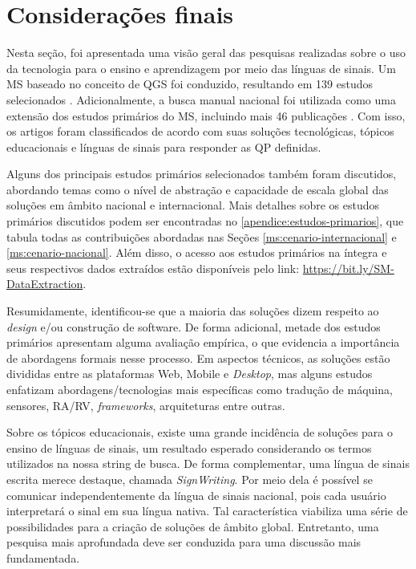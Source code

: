 \section{Considerações finais}
\label{ms:fim}

Nesta seção, foi apresentada uma visão geral das pesquisas realizadas sobre o uso da tecnologia para o ensino e aprendizagem por meio das línguas de sinais. Um MS baseado no conceito de QGS foi conduzido, resultando em 139 estudos selecionados \cite{FalvoJr2020_FIE}. Adicionalmente, a busca manual nacional foi utilizada como uma extensão dos estudos primários do MS, incluindo mais 46 publicações \cite{FalvoJr2020_SBIE}. Com isso, os artigos foram classificados de acordo com suas soluções tecnológicas, tópicos educacionais e línguas de sinais para responder as QP definidas. 

Alguns dos principais estudos primários selecionados também foram discutidos, abordando temas como o nível de abstração e capacidade de escala global das soluções em âmbito nacional e internacional. Mais detalhes sobre os estudos primários discutidos podem ser encontradas no \autoref{apendice:estudos-primarios}, que tabula todas as contribuições abordadas nas Seções \ref{ms:cenario-internacional} e \ref{ms:cenario-nacional}. Além disso, o acesso aos estudos primários na íntegra e seus respectivos dados extraídos estão disponíveis pelo link: \url{https://bit.ly/SM-DataExtraction}.

Resumidamente, identificou-se que a maioria das soluções dizem respeito ao \textit{design} e/ou construção de software. De forma adicional, metade dos estudos primários apresentam alguma avaliação empírica, o que evidencia a importância de abordagens formais nesse processo. Em aspectos técnicos, as soluções estão divididas entre as plataformas Web, Mobile e \textit{Desktop}, mas alguns estudos enfatizam abordagens/tecnologias mais específicas como tradução de máquina, sensores, RA/RV, \textit{frameworks}, arquiteturas entre outras.

Sobre os tópicos educacionais, existe uma grande incidência de soluções para o ensino de línguas de sinais, um resultado esperado considerando os termos utilizados na nossa string de busca. De forma complementar, uma língua de sinais escrita merece destaque, chamada \textit{SignWriting}. Por meio dela é possível se comunicar  independentemente da língua de sinais nacional, pois cada usuário interpretará o sinal em sua língua nativa. Tal característica viabiliza uma série de possibilidades para a criação de soluções de âmbito global. Entretanto, uma pesquisa mais aprofundada deve ser conduzida para uma discussão mais fundamentada.

